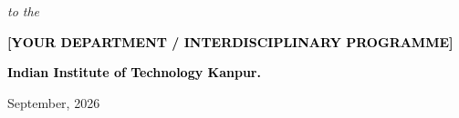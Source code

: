 \begin{titlepage}
\begin{center}
    
    {\large \textit{to the}\par}
    \vspace{0.1cm}
    {\large \textbf{{\textcolor{black}{[YOUR DEPARTMENT / INTERDISCIPLINARY PROGRAMME]}}}} %

    {\large \textbf{{\textcolor{black}{Indian Institute of Technology Kanpur.}}}}
    \vspace{0.4cm}
    
    {\large {September, 2026}}
\end{center}
\end{titlepage}